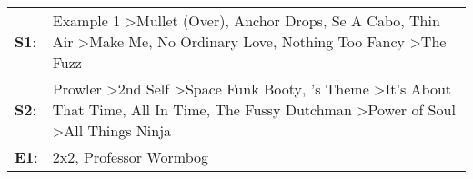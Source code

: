 \begin{supertabular}{p{0.03\textwidth}p{0.92\textwidth}}
 \textbf{S1}:  &                                              Example 1\textsuperscript{} \textgreater \enspace Mullet (Over)\textsuperscript{}, \enspace Anchor Drops\textsuperscript{}, \enspace Se A Cabo\textsuperscript{}, \enspace Thin Air\textsuperscript{} \textgreater \enspace Make Me\textsuperscript{}, \enspace No Ordinary Love\textsuperscript{}, \enspace Nothing Too Fancy\textsuperscript{} \textgreater \enspace The Fuzz\textsuperscript{}  \enspace  \\
 \textbf{S2}:  &  Prowler\textsuperscript{} \textgreater \enspace 2nd Self\textsuperscript{} \textgreater \enspace Space Funk Booty\textsuperscript{}, 's Theme\textsuperscript{} \textgreater \enspace It's About That Time\textsuperscript{}, \enspace All In Time\textsuperscript{}, \enspace The Fussy Dutchman\textsuperscript{} \textgreater \enspace Power of Soul\textsuperscript{} \textgreater \enspace All Things Ninja\textsuperscript{}  \enspace  \\
 \textbf{E1}:  &                                                                                                                                                                                                                                                                                                                                                                            2x2\textsuperscript{}, \enspace Professor Wormbog\textsuperscript{}  \enspace  \\
\end{supertabular}
